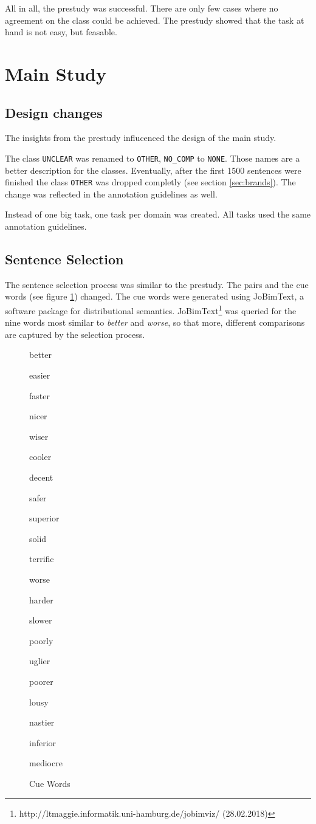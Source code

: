 All in all, the prestudy was successful. There are only few cases where no agreement on the class could be achieved. The prestudy showed that the task at hand is not easy, but feasable.

\newpage
\section{Main Study}
\label{sec:mainstudy}
\subsection{Design changes}
\label{sec:designchanges}
The insights from the prestudy influcenced the design of the main study.

The class \texttt{UNCLEAR} was renamed to \texttt{OTHER}, \texttt{NO\_COMP} to \texttt{NONE}. Those names are a better description for the classes. Eventually, after the first 1500 sentences were finished the class \texttt{OTHER} was dropped completly (see section \ref{sec:brands}). The change was reflected in the annotation guidelines as well. 

Instead of one big task, one task per domain was created. All tasks used the same annotation guidelines.


\subsection{Sentence Selection}
The sentence selection process was similar to the prestudy. The pairs and the cue words (see figure \ref{fig:cue_words}) changed. The cue words were generated using JoBimText, a software package for distributional semantics. JoBimText\footnote{http://ltmaggie.informatik.uni-hamburg.de/jobimviz/ (28.02.2018)} was queried for the nine words most similar to \emph{better} and \emph{worse}, so that more, different comparisons are captured by the selection process.

\begin{figure}[h]
\centering
\caption{Cue Words}
\label{fig:cue_words}
\begin{multicols}{4}
better

easier

faster

nicer

wiser

cooler

decent

safer

superior

solid

terrific

worse

harder

slower

poorly

uglier

poorer

lousy

nastier

inferior

mediocre
\end{multicols}
\end{figure}

